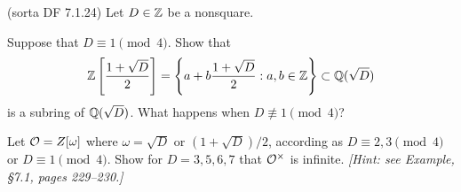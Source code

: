 
\begin{problem}{(\textsf{sorta DF 7.1.24})}
  Let $D \in \mathbb{Z}$ be a nonsquare.
  \begin{enumalph}
  \item Suppose that $D \equiv 1 \pmod{4}$.
    Show that
    \[ \mathbb{Z}\left[\frac{1+\sqrt{D}}{2}\right]=\left\{a+b\frac{1+\sqrt{D}}{2}:a,b \in \mathbb{Z} \right\}
    \subset \mathbb{Q}(\sqrt{D}) \] is a subring of $\mathbb{Q}(\sqrt{D})$.
    What happens when $D \not\equiv 1 \pmod{4}$?
  \item Let $\mathcal{O}=Z[\omega]$ where $\omega=\sqrt{D}$ or $(1+\sqrt{D})/2$,
    according as $D \equiv 2,3 \pmod{4}$ or $D \equiv 1 \pmod{4}$.
    Show for $D=3,5,6,7$ that $\mathcal{O}^\times$ is infinite.
    \emph{[Hint: see Example, \S 7.1, pages 229--230.]}
  \end{enumalph}
\end{problem}
